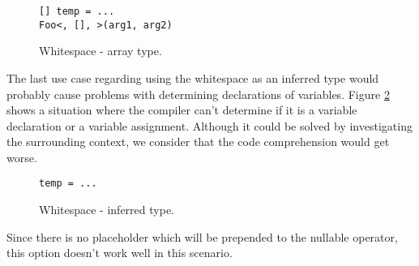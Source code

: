\begin{figure}[h]
\begin{lstlisting}[style=csharp]
[] temp = ...
Foo<, [], >(arg1, arg2)
\end{lstlisting}
\caption{Whitespace - array type.}
\label{img46:opW4}
\end{figure}
\par
The last use case regarding using the whitespace as an inferred type would probably cause problems with determining declarations of variables. 
Figure \ref{img47:opW5} shows a situation where the compiler can’t determine if it is a variable declaration or a variable assignment. 
Although it could be solved by investigating the surrounding context, we consider that the code comprehension would get worse.
\begin{figure}[h]
\begin{lstlisting}[style=csharp]
temp = ...
\end{lstlisting}
\caption{Whitespace - inferred type.}
\label{img47:opW5}
\end{figure}
\par
Since there is no placeholder which will be prepended to the nullable operator, this option doesn't work well in this scenario.

